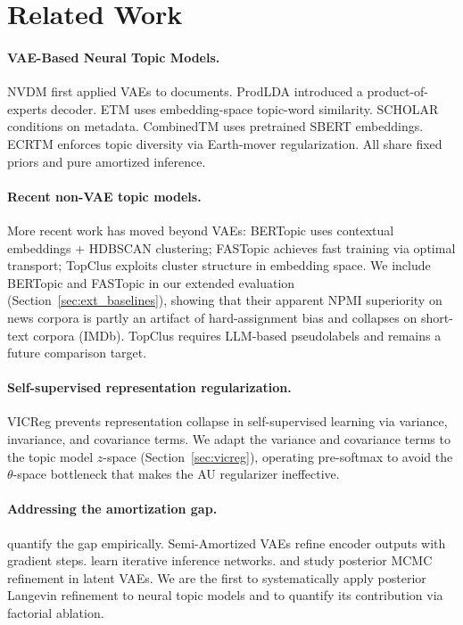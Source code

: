 \documentclass[10pt]{article}
\begin{document}
\section{Related Work}
\label{sec:related}

\paragraph{VAE-Based Neural Topic Models.}
NVDM \citep{miao2016nvdm} first applied VAEs to documents.
ProdLDA \citep{srivastava2017} introduced a product-of-experts decoder.
ETM \citep{dieng2020} uses embedding-space topic-word similarity.
SCHOLAR \citep{card2018} conditions on metadata.
CombinedTM \citep{bianchi2021} uses pretrained SBERT embeddings.
ECRTM \citep{wu2023} enforces topic diversity via Earth-mover regularization.
All share fixed priors and pure amortized inference.

\paragraph{Recent non-VAE topic models.}
More recent work has moved beyond VAEs: BERTopic \citep{grootendorst2022} uses
contextual embeddings + HDBSCAN clustering; FASTopic \citep{wu2024fastopic} achieves
fast training via optimal transport; TopClus \citep{meng2022topclus} exploits
cluster structure in embedding space. We include BERTopic and FASTopic in our
extended evaluation (Section~\ref{sec:ext_baselines}), showing that their apparent
NPMI superiority on news corpora is partly an artifact of hard-assignment bias
and collapses on short-text corpora (IMDb). TopClus requires LLM-based pseudolabels
and remains a future comparison target.

\paragraph{Self-supervised representation regularization.}
VICReg \citep{bardes2022vicreg} prevents representation collapse in self-supervised
learning via variance, invariance, and covariance terms. We adapt the variance
and covariance terms to the topic model $z$-space (Section~\ref{sec:vicreg}),
operating pre-softmax to avoid the $\theta$-space bottleneck that makes
the AU regularizer ineffective.

\paragraph{Addressing the amortization gap.}
\citet{cremer2018} quantify the gap empirically.
Semi-Amortized VAEs \citep{kim2018} refine encoder outputs with gradient steps.
\citet{marino2018} learn iterative inference networks.
\citet{hoffman2017} and \citet{ruiz2019} study posterior MCMC refinement in latent VAEs.
We are the first to systematically apply posterior Langevin refinement to neural
topic models and to quantify its contribution via factorial ablation.
\end{document}
